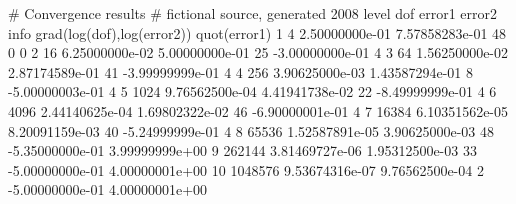 # Convergence results
# fictional source, generated 2008
level dof error1 error2 info grad(log(dof),log(error2)) quot(error1)
1 4 2.50000000e-01 7.57858283e-01 48 0 0
2 16 6.25000000e-02 5.00000000e-01 25 -3.00000000e-01 4
3 64 1.56250000e-02 2.87174589e-01 41 -3.99999999e-01 4
4 256 3.90625000e-03 1.43587294e-01 8 -5.00000003e-01 4
5 1024 9.76562500e-04 4.41941738e-02 22 -8.49999999e-01 4
6 4096 2.44140625e-04 1.69802322e-02 46 -6.90000001e-01 4
7 16384 6.10351562e-05 8.20091159e-03 40 -5.24999999e-01 4
8 65536 1.52587891e-05 3.90625000e-03 48 -5.35000000e-01 3.99999999e+00
9 262144 3.81469727e-06 1.95312500e-03 33 -5.00000000e-01 4.00000001e+00
10 1048576 9.53674316e-07 9.76562500e-04 2 -5.00000000e-01 4.00000001e+00
